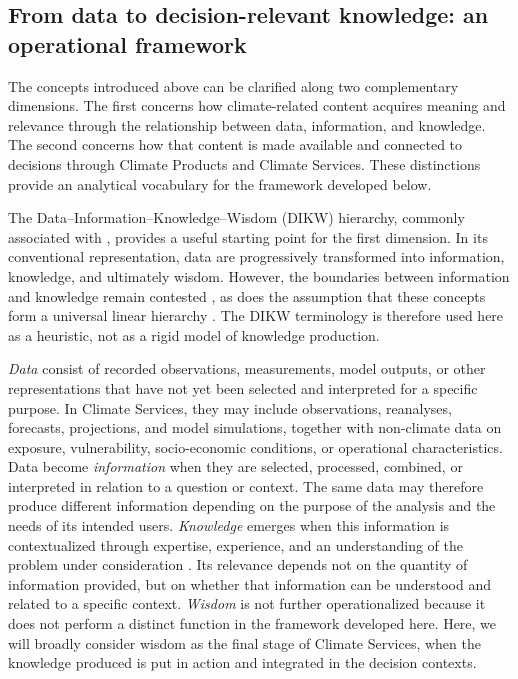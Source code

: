 \subsection{From data to decision-relevant knowledge: an operational framework}

The concepts introduced above can be clarified along two complementary dimensions. The first concerns how climate-related content acquires meaning and relevance through the relationship between data, information, and knowledge. The second concerns how that content is made available and connected to decisions through Climate Products and Climate Services. These distinctions provide an analytical vocabulary for the framework developed below.

The Data--Information--Knowledge--Wisdom (DIKW) hierarchy, commonly associated with \citet{ackoff_data_1989}, provides a useful starting point for the first dimension. In its conventional representation, data are progressively transformed into information, knowledge, and ultimately wisdom. However, the boundaries between information and knowledge remain contested \citep{rowley_wisdom_2007}, as does the assumption that these concepts form a universal linear hierarchy \citep{fricke_knowledge_2009}. The DIKW terminology is therefore used here as a heuristic, not as a rigid model of knowledge production.

\textit{Data} consist of recorded observations, measurements, model outputs, or other representations that have not yet been selected and interpreted for a specific purpose. In Climate Services, they may include observations, reanalyses, forecasts, projections, and model simulations, together with non-climate data on exposure, vulnerability, socio-economic conditions, or operational characteristics. Data become \textit{information} when they are selected, processed, combined, or interpreted in relation to a question or context. The same data may therefore produce different information depending on the purpose of the analysis and the needs of its intended users. \textit{Knowledge} emerges when this information is contextualized through expertise, experience, and an understanding of the problem under consideration \citep{rowley_wisdom_2007,weichselgartner_evolving_2019}. Its relevance depends not on the quantity of information provided, but on whether that information can be understood and related to a specific context. \textit{Wisdom} is not further operationalized because it does not perform a distinct function in the framework developed here. Here, we will broadly consider wisdom as the final stage of Climate Services, when the knowledge produced is put in action and integrated in the decision contexts.

